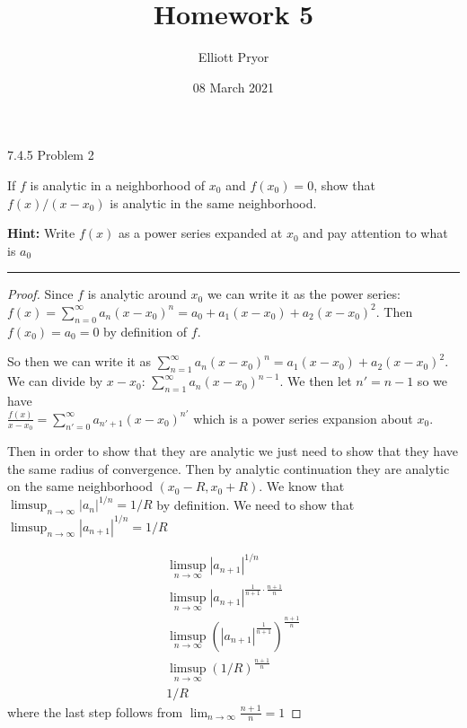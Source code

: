 \documentclass[11pt]{article}
\title{Homework 5}
\author{Elliott Pryor}
\date{08 March 2021}
\begin{document}
\maketitle

 7.4.5 Problem 2

If $f$ is analytic in a neighborhood of $x_0$ and $f(x_0) = 0$, 
show that $f(x)/(x - x_0)$ is analytic in the same neighborhood.

\textbf{Hint:} Write $f(x)$ as a power series expanded at $x_0$ and pay attention to what is $a_0$

\hrule

\begin{proof}
    
    Since $f$ is analytic around $x_0$ we can write it as the power series: 
    $f(x) = \sum_{n=0} ^\infty a_n (x - x_0)^n = a_0 + a_1 (x - x_0) + a_2 (x - x_0)^2$.
    Then $f(x_0) = a_0 = 0$ by definition of $f$.  

    So then we can write it as $\sum_{n=1} ^\infty a_n (x - x_0)^n = a_1 (x - x_0) + a_2 (x - x_0)^2$.
    We can divide by $x - x_0$: $\sum_{n=1} ^\infty a_n (x - x_0)^{n-1}$.
    We then let $n' = n-1$ so we have\\
    $\frac{f(x)}{x-x_0} = \sum_{n'=0} ^\infty a_{n'+1} (x - x_0)^{n'}$
    which is a power series expansion about $x_0$.

    Then in order to show that they are analytic we just need to show that they have the same radius of convergence.
    Then by analytic continuation they are analytic on the same neighborhood $(x_0 - R, x_0 + R)$.
    We know that $\limsup_{n \to \infty} |a_n|^{1/n} = 1/R$ by definition.
    We need to show that $\limsup_{n \to \infty} |a_{n+1}|^{1/n} = 1/R$

    \begin{align*}
        \limsup_{n \to \infty} |a_{n+1}|^{1/n} \\
        \limsup_{n \to \infty} |a_{n+1}|^{\frac{1}{n+1} \cdot \frac{n+1}{n}}\\
        \limsup_{n \to \infty} \left(|a_{n+1}|^{\frac{1}{n+1}}\right)^{\frac{n+1}{n}}\\
        \limsup_{n \to \infty} (1/R)^{\frac{n+1}{n}}\\
        1/R
    \end{align*}
    where the last step follows from $\lim_{n \to \infty} \frac{n+1}{n} = 1$
\end{proof}
\end{document}
